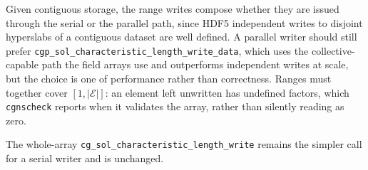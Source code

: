 \documentclass[11pt,letterpaper]{article}
\newif\ifvfourdraft
\newenvironment{v4block}{\ifvfourdraft\color{v4violet}\fi\ignorespaces}{\par}
\begin{document}
\begin{v4block}
Given contiguous storage, the range writes compose whether they are issued
through the serial or the parallel path, since HDF5 independent writes to
disjoint hyperslabs of a contiguous dataset are well defined.  A parallel writer
should still prefer \texttt{cgp\_sol\_characteristic\_length\_write\_data}, which
uses the collective-capable path the field arrays use and outperforms
independent writes at scale, but the choice is one of performance rather than
correctness.  Ranges must together cover $[1, |\mathcal{E}|]$: an element left
unwritten has undefined factors, which \texttt{cgnscheck} reports when it
validates the array, rather than silently reading as zero.

The whole-array \texttt{cg\_sol\_characteristic\_length\_write} remains the
simpler call for a serial writer and is unchanged.

\end{v4block}
\end{document}
